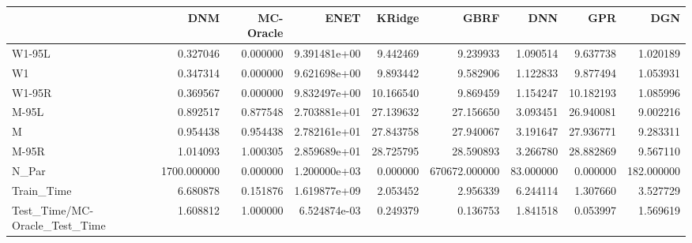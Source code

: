 \begin{tabular}{lrrrrrrrr}
\toprule
{} &          DNM &  MC-Oracle &          ENET &     KRidge &           GBRF &        DNN &        GPR &         DGN \\
\midrule
W1-95L                        &     0.327046 &   0.000000 &  9.391481e+00 &   9.442469 &       9.239933 &   1.090514 &   9.637738 &    1.020189 \\
W1                            &     0.347314 &   0.000000 &  9.621698e+00 &   9.893442 &       9.582906 &   1.122833 &   9.877494 &    1.053931 \\
W1-95R                        &     0.369567 &   0.000000 &  9.832497e+00 &  10.166540 &       9.869459 &   1.154247 &  10.182193 &    1.085996 \\
M-95L                         &     0.892517 &   0.877548 &  2.703881e+01 &  27.139632 &      27.156650 &   3.093451 &  26.940081 &    9.002216 \\
M                             &     0.954438 &   0.954438 &  2.782161e+01 &  27.843758 &      27.940067 &   3.191647 &  27.936771 &    9.283311 \\
M-95R                         &     1.014093 &   1.000305 &  2.859689e+01 &  28.725795 &      28.590893 &   3.266780 &  28.882869 &    9.567110 \\
N\_Par                         &  1700.000000 &   0.000000 &  1.200000e+03 &   0.000000 &  670672.000000 &  83.000000 &   0.000000 &  182.000000 \\
Train\_Time                    &     6.680878 &   0.151876 &  1.619877e+09 &   2.053452 &       2.956339 &   6.244114 &   1.307660 &    3.527729 \\
Test\_Time/MC-Oracle\_Test\_Time &     1.608812 &   1.000000 &  6.524874e-03 &   0.249379 &       0.136753 &   1.841518 &   0.053997 &    1.569619 \\
\bottomrule
\end{tabular}

